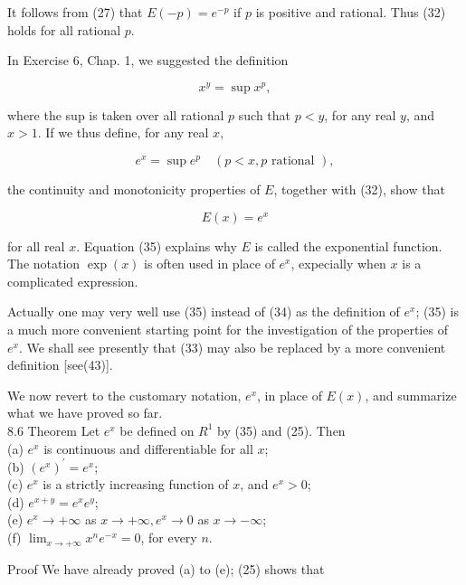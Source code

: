 \documentclass[10pt]{article}
\begin{document}
It follows from (27) that $E(-p)=e^{-p}$ if $p$ is positive and rational. Thus (32) holds for all rational $p$.

In Exercise 6, Chap. 1, we suggested the definition


\begin{equation*}
x^{y}=\sup x^{p}, \tag{33}
\end{equation*}


where the sup is taken over all rational $p$ such that $p<y$, for any real $y$, and $x>1$. If we thus define, for any real $x$,


\begin{equation*}
e^{x}=\sup e^{p} \quad(p<x, p \text { rational }), \tag{34}
\end{equation*}


the continuity and monotonicity properties of $E$, together with (32), show that


\begin{equation*}
E(x)=e^{x} \tag{35}
\end{equation*}


for all real $x$. Equation (35) explains why $E$ is called the exponential function.\\
The notation $\exp (x)$ is often used in place of $e^{x}$, expecially when $x$ is a complicated expression.

Actually one may very well use (35) instead of (34) as the definition of $e^{x}$; (35) is a much more convenient starting point for the investigation of the properties of $e^{x}$. We shall see presently that (33) may also be replaced by a more convenient definition [see(43)].

We now revert to the customary notation, $e^{x}$, in place of $E(x)$, and summarize what we have proved so far.\\
8.6 Theorem Let $e^{x}$ be defined on $R^{1}$ by (35) and (25). Then\\
(a) $e^{x}$ is continuous and differentiable for all $x$;\\
(b) $\left(e^{x}\right)^{\prime}=e^{x}$;\\
(c) $e^{x}$ is a strictly increasing function of $x$, and $e^{x}>0$;\\
(d) $e^{x+y}=e^{x} e^{y}$;\\
(e) $e^{x} \rightarrow+\infty$ as $x \rightarrow+\infty, e^{x} \rightarrow 0$ as $x \rightarrow-\infty$;\\
(f) $\lim _{x \rightarrow+\infty} x^{n} e^{-x}=0$, for every $n$.

Proof We have already proved (a) to (e); (25) shows that
\end{document}
